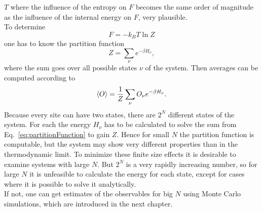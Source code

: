     \(T\) where the influence of the entropy on \(F\) becomes the same
    order of magnitude as the influence of the internal energy on \(F\),
    very plausible.\\
    To determine
    \begin{equation}
        F=-k_{B}T \ln{Z}
    \end{equation}
    one has to know the partition function
    \begin{equation}
        Z = \sum_\nu e^{-\beta H_\nu},
        \label{eq:partitionFunction}
    \end{equation}
    where the sum goes over all possible states \(\nu\) of the system.
    Then averages can be computed according to
    \begin{equation}
        \left< O \right> = \frac{1}{Z} \sum_\nu O_\nu e^{-\beta H_\nu}.
    \end{equation}
    Because every site can have two states, there are \(2^N\) different
    states of the system. For each the energy \(H_\nu\) has to be calculated
    to solve the sum from Eq.\ \eqref{eq:partitionFunction} to gain \(Z\).
    Hence for small \(N\) the partition function is computable, but the system
    may show very different properties than in the thermodynamic limit.
    To minimize these finite size effects it is desirable to examine
    systems with large \(N\). But \(2^N\) is a very rapidly increasing
    number, so for large \(N\) it is unfeasible to calculate the energy for each state, except
    for cases where it is possible to solve it analytically.\\
    If not, one can get estimates of the observables for big \(N\) using
    Monte Carlo simulations, which are introduced in the next chapter.\\

